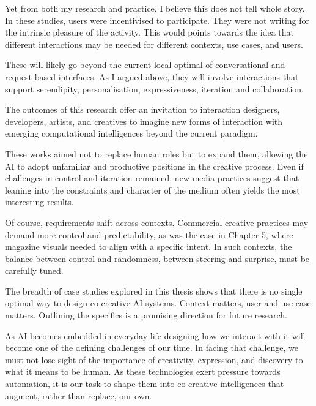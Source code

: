 Yet from both my research and practice, I believe this does not tell whole story. In these studies, users were incentivised to participate. They were not writing for the intrinsic pleasure of the activity. This would points towards the idea that different interactions may be needed for different contexts, use cases, and users. 

These will likely go beyond the current local optimal of conversational and request-based interfaces. As I argued above, they will involve interactions that support serendipity, personalisation, expressiveness, iteration and collaboration.

The outcomes of this research offer an invitation to interaction designers, developers, artists, and creatives to imagine new forms of interaction with emerging computational intelligences beyond the current paradigm. 

These works aimed not to replace human roles but to expand them, allowing the AI to adopt unfamiliar and productive positions in the creative process. Even if challenges in control and iteration remained, new media practices suggest that leaning into the constraints and character of the medium often yields the most interesting results.

Of course, requirements shift across contexts. Commercial creative practices may demand more control and predictability, as was the case in Chapter 5, where magazine visuals needed to align with a specific intent. In such contexts, the balance between control and randomness, between steering and surprise, must be carefully tuned.

The breadth of case studies explored in this thesis shows that there is no single optimal way to design co-creative AI systems. Context matters, user and use case matters. Outlining the specifics is a promising direction for future research. 

As AI becomes embedded in everyday life designing how we interact with it will become one of the defining challenges of our time. In facing that challenge, we must not lose sight of the importance of creativity, expression, and discovery to what it means to be human. As these technologies exert pressure towards automation, it is our task to shape them into co-creative intelligences that augment, rather than replace, our own.

